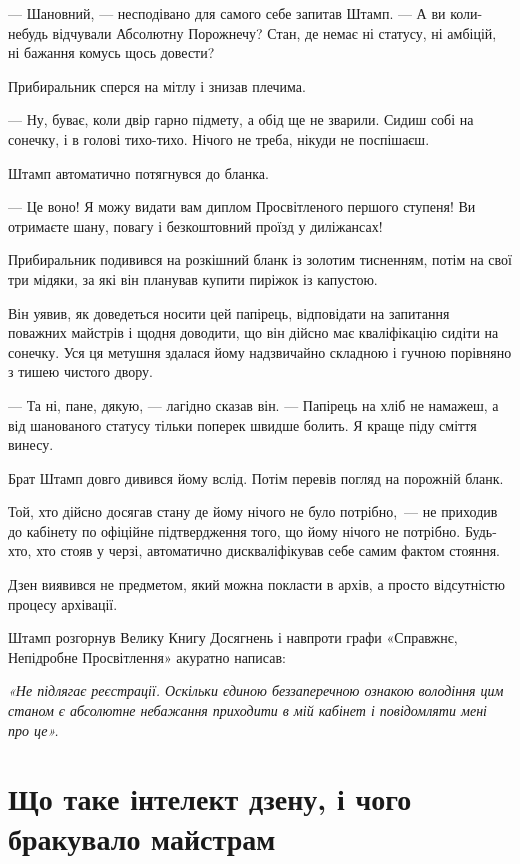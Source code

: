 \documentclass[12pt, a4paper, openany]{book}
\begin{document}
\begin{terrybox}
--- Шановний, --- несподівано для самого себе запитав Штамп. --- А ви коли-небудь відчували Абсолютну Порожнечу? Стан, де немає ні статусу, ні амбіцій, ні бажання комусь щось довести?

Прибиральник сперся на мітлу і знизав плечима.

--- Ну, буває, коли двір гарно підмету, а обід ще не зварили. Сидиш собі на сонечку, і в голові тихо-тихо. Нічого не треба, нікуди не поспішаєш.

Штамп автоматично потягнувся до бланка.

--- Це воно! Я можу видати вам диплом Просвітленого першого ступеня! Ви отримаєте шану, повагу і безкоштовний проїзд у диліжансах!

Прибиральник подивився на розкішний бланк із золотим тисненням, потім на свої три мідяки, за які він планував купити пиріжок із капустою.

Він уявив, як доведеться носити цей папірець, відповідати на запитання поважних майстрів і щодня доводити, що він дійсно має кваліфікацію сидіти на сонечку. Уся ця метушня здалася йому надзвичайно складною і гучною порівняно з тишею чистого двору.

--- Та ні, пане, дякую, --- лагідно сказав він. --- Папірець на хліб не намажеш, а від шанованого статусу тільки поперек швидше болить. Я краще піду сміття винесу.

\medskip
Брат Штамп довго дивився йому вслід. Потім перевів погляд на порожній бланк.

Той, хто дійсно досягав стану де йому нічого не було потрібно,~--- не приходив до кабінету по офіційне підтвердження того, що йому нічого не потрібно. Будь-хто, хто стояв у черзі, автоматично дискваліфікував себе самим фактом стояння.

Дзен виявився не предметом, який можна покласти в архів, а просто відсутністю процесу архівації.

Штамп розгорнув Велику Книгу Досягнень і навпроти графи «Справжнє, Непідробне Просвітлення» акуратно написав:

\medskip
\textit{«Не підлягає реєстрації. Оскільки єдиною беззаперечною ознакою володіння цим станом є абсолютне небажання приходити в мій кабінет і повідомляти мені про це».}
\end{terrybox}


\section{Що таке інтелект дзену, і чого бракувало майстрам}
\end{document}
